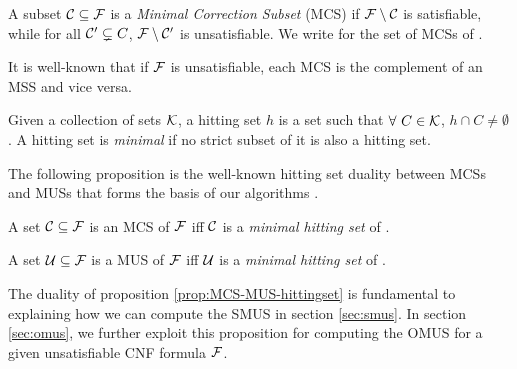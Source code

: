 \begin{definition}
    A subset $\mathcal{C} \subseteq \mathcal{F}$ is a \emph{Minimal Correction Subset} (MCS) if $\mathcal{F}\setminus\mathcal{C}$ is satisfiable, while for all 
    $ \mathcal{C}' \subsetneq C$,  $\mathcal{F} \setminus \mathcal{C}'$ is unsatisfiable.
    We write \mcses{\F} for the set of MCSs of \F. 
\end{definition}

It is well-known that if $\mathcal{F}$ is unsatisfiable, each  MCS is the complement of an MSS and vice versa. 

\begin{definition}\label{def:minimal-hs}
    Given a collection of sets $\mathcal{K}$, a hitting set $h$ is a set such that $\forall \ C \in \mathcal{K}$, $h \cap C \neq \emptyset$. A hitting set is \emph{minimal} if no strict subset of it is also a hitting set. 
\end{definition}



The following proposition is the well-known hitting set duality  between MCSs and MUSs that forms the basis of our algorithms \cite{DBLP:journals/jar/LiffitonS08,ai/Reiter87}.

\begin{proposition}\label{prop:MCS-MUS-hittingset}
%     
    A set  $\mathcal{C} \subseteq \mathcal{F}$ is an MCS of $ \mathcal{F}$ iff  $\mathcal{C}$ is a \emph{minimal hitting set} of .

    A set  $\mathcal{U} \subseteq \mathcal{F}$ is a MUS of $ \mathcal{F}$ iff  $\mathcal{U}$ is a \emph{minimal hitting set} of .
\end{proposition}

The duality of proposition \ref{prop:MCS-MUS-hittingset} is fundamental to explaining how we can compute the SMUS in section \ref{sec:smus}. 
In section \ref{sec:omus}, we further exploit this proposition for computing the OMUS for a given unsatisfiable CNF formula $\mathcal{F}$.
